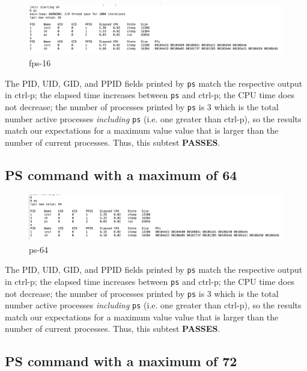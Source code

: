 \documentclass[11pt,letterpaper]{report}
\begin{document}
\begin{figure}[h!]
\centering
\includegraphics[width=.9\linewidth]{ps-16.png}
\caption[ps-16t]{fps-16}
\label{fig:ps-16}
\end{figure}

The PID, UID, GID, and PPID fields printed by {\tt ps} match the respective output in ctrl-p; the elapsed time increases between {\tt ps} and ctrl-p; the 
	CPU time does not decrease; the number of processes printed by {\tt ps} is 3 which is the total number active processes \emph{including} {\tt ps} (i.e. 
	 one greater than ctrl-p),
	 so the results match our expectations for a maximum value value that is larger than the number of current processes. Thus, this subtest \textbf{PASSES}.

\subsection*{PS command with a maximum of 64}

\begin{figure}[h!]
\centering
\includegraphics[width=.9\linewidth]{ps-64.png}
\caption[ps-64t]{ps-64}
\label{fig:fps-64}
\end{figure}

The PID, UID, GID, and PPID fields printed by {\tt ps} match the respective output in ctrl-p; the elapsed time increases between {\tt ps} and ctrl-p; the 
	CPU time does not decrease; the number of processes printed by {\tt ps} is 3 which is the total number active processes \emph{including} {\tt ps} (i.e. 
	 one greater than ctrl-p),
	 so the results match our expectations for a maximum value value that is larger than the number of current processes. Thus, this subtest \textbf{PASSES}.

\newpage

\subsection*{PS command with a maximum of 72}
\end{document}
